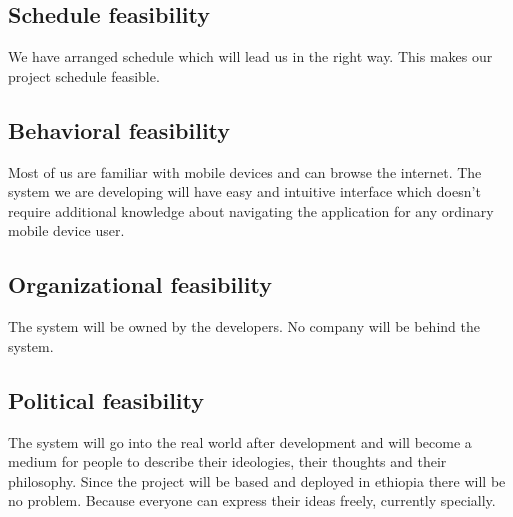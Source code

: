 	\subsection{Schedule feasibility}
   We have arranged schedule which will lead us in the right way. This makes our project schedule feasible.

	\subsection{Behavioral feasibility}
   Most of us are familiar with mobile devices and can browse the internet. The system we are developing will have easy and intuitive interface which doesn't require additional knowledge about navigating the application for any ordinary mobile device user.

   \subsection{Organizational feasibility}
   The system will be owned by the developers. No company will be behind the system.

   \subsection{Political feasibility}
   The system will go into the real world after development and will become a medium for people to describe their ideologies, their thoughts and their philosophy. Since the project will be based and deployed in ethiopia there will be no problem. Because everyone can express their ideas freely, currently specially.
